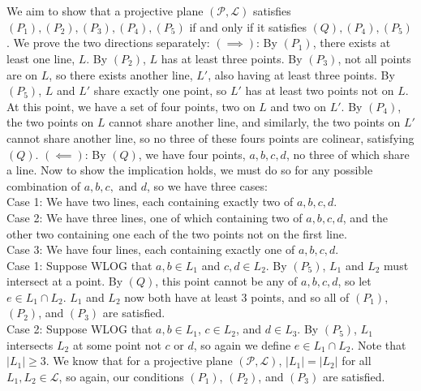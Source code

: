 \documentclass{article}
\begin{document}
\section{} %
We aim to show that a projective plane $(\mathcal{P},\mathcal{L})$ satisfies
$(P_1),(P_2),(P_3),(P_4),(P_5)$ if and only if it satisfies $(Q),(P_4),(P_5)$.
We prove the two directions separately:
\newline
\newline
$(\implies)$: By $(P_1)$, there exists at least one line, $L$. By $(P_2)$, $L$ has at least
three points. By $(P_3)$, not all points are on $L$, so there exists
another line, $L'$, also having at least three points. By $(P_5)$, $L$ and $L'$
share exactly one point, so $L'$ has at least two points not on $L$. At this
point, we have a set of four points, two on $L$ and two on $L'$. By $(P_4)$, the
two points on $L$ cannot share another line, and similarly, the two points on
$L'$ cannot share another line, so no three of these fours points are colinear,
satisfying $(Q)$.
\newline
\newline
$(\impliedby)$: By $(Q)$, we have four points, $a,b,c,d$, no three of which
share a line. Now to show the implication holds, we must do so for any possible
combination of $a,b,c,\text{ and }d$, so we have three cases:\\
Case 1: We have two lines, each containing exactly two of $a,b,c,d$.\\
Case 2: We have three lines, one of which containing two of $a,b,c,d$, and the
other two containing one each of the two points not on the first line.\\
Case 3: We have four lines, each containing exactly one of $a,b,c,d$.\\
\newline
Case 1: Suppose WLOG that $a,b\in L_1$ and $c,d\in L_2$. By $(P_5)$, $L_1$ and
$L_2$ must intersect at a point. By $(Q)$, this point cannot be any of $a,b,c,d$,
so let $e\in L_1\cap L_2$. $L_1$ and $L_2$ now both have at least $3$ points,
and so all of $(P_1)$, $(P_2)$, and $(P_3)$ are satisfied.\\
\newline
Case 2: Suppose WLOG that $a,b\in L_1$, $c\in L_2$, and $d\in L_3$. By $(P_5)$,
$L_1$ intersects $L_2$ at some point not $c$ or $d$, so again we define
$e\in L_1\cap L_2$. Note that $|L_1|\ge3$. We know that for a projective plane
$(\mathcal{P},\mathcal{L})$, $|L_1|=|L_2|$ for all $L_1,L_2\in\mathcal{L}$, so
again, our conditions $(P_1)$, $(P_2)$, and $(P_3)$ are satisfied.\\
\end{document}
